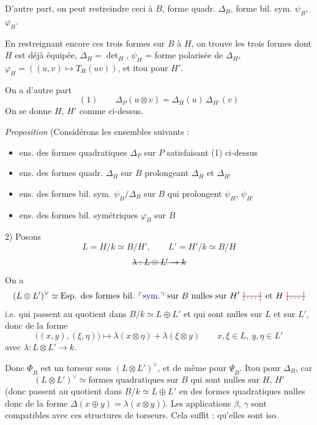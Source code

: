 \documentclass[11pt,a4paper]{article}
\begin{document}
D'autre part, on peut restreindre ceci à $B$, 
forme quadr. $\Delta_B$, forme bil. sym. $\psi_B$, $\varphi_B$.

En restreignant encore ces trois formes sur $B$ à $H$, on trouve les trois formes dont $H$ est déjà équipée, $\Delta_H=\det_H$, $\psi_H$ = forme polarisée de $\Delta_H$, $\varphi_H = ((u,v)\mapsto T_H(uv))$, et itou pour $H'$.

On a d'autre part
\[ (1) \qquad \Delta_P(u\otimes v) = \Delta_H(u)\,\Delta_{H'}(v) \]
On se donne $H$, $H'$ comme ci-dessus.

\emph{Proposition} (Considérons les   ensembles suivants :
\begin{itemize}
\item[$\underline{Q}_P$ :]  ens. des formes quadratiques $\Delta_P$ sur $P$ satisfaisant (1) ci-dessus
\item[$\underline{Q}_B$ :]  ens. des formes  quadr. $\Delta_B$ sur $B$ prolongeant $\Delta_H$ et $\Delta_{H'}$
\item[$\underline{\Psi}_B$ :] \struck{$(\psi)$} ens. des formes bil. sym. $\psi_B/\Delta_B$ sur $B$ qui prolongent $\psi_H$, $\psi_{H'}$
\item[$\underline{\Phi}_B$ :] \struck{$(\varphi)$} ens. des formes bil. symétriques $\varphi_B$ sur $B$
\end{itemize}

2)  Posons
\[ L = H/k \simeq B/H' , \qquad L' = H'/k \simeq B/H \]
\[ \text{\struck{$\lambda : L\otimes L' \to k$}} \]
On a
\[ (L\otimes L')^{\vee} \simeq \text{Esp. des formes bil. \add{sym.} sur $B$ nulles sur $H'$ \struck{\ill{}} et $H$ \struck{\ill{}}} \]
i.e. qui passent au quotient \struck{\ill{}} dans $B/k\simeq L\oplus L'$ et qui sont nulles sur $L$ et sur $L'$, donc de la forme
\[ \bigl((x,y),(\xi,\eta)\bigr) \longmapsto \lambda(x\otimes\eta) + \lambda(\xi\otimes y) \qquad x,\xi\in L,\ y,\eta\in L' \]
avec $\lambda : L\otimes L'\to k$.

Donc $\underline{\Phi}_B$ est un torseur sous $(L\otimes L')^{\vee}$, et de même pour $\underline{\Psi}_B$. Itou pour $\Delta_B$, car
\[ (L\otimes L')^{\vee} \simeq \text{formes quadratiques sur $B$ qui sont nulles sur $H$, $H'$} \]
(donc passent au quotient \struck{\ill{}} dans $B/k\simeq L\oplus L'$ en des formes quadratiques nulles  donc de  la forme
$\Delta(x\oplus y) = \lambda(x\otimes y)$).
Les applications $\beta$, $\gamma$ sont compatibles avec ces structures de torseurs. Cela suffit : \ill{} qu'elles sont iso.
\end{document}
